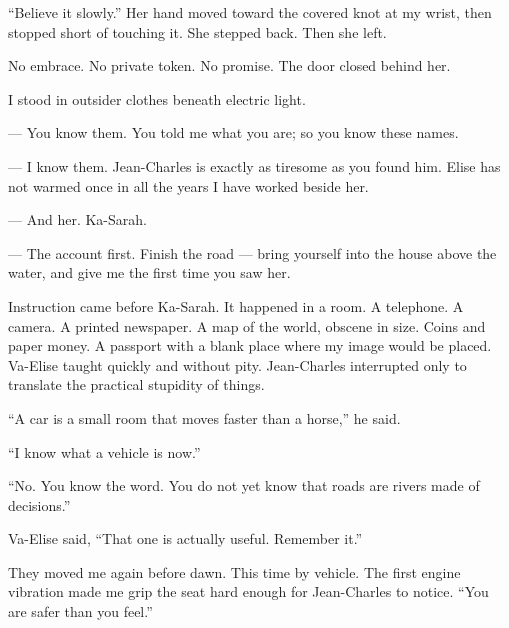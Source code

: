 ``Believe it slowly.'' Her hand moved toward the covered knot at my wrist, then stopped short of touching it. She stepped back. Then she left.\par

No embrace. No private token. No promise. The door closed behind her.\par

I stood in outsider clothes beneath electric light.\par

\ornament

\begin{room}

--- You know them. You told me what you are; so you know these names.

--- I know them. Jean-Charles is exactly as tiresome as you found him. Elise has not warmed once in all the years I have worked beside her.

--- And her. Ka-Sarah.

--- The account first. Finish the road --- bring yourself into the house above the water, and give me the first time you saw her.

\end{room}

\ornament

Instruction came before Ka-Sarah. It happened in a room. A telephone. A camera. A printed newspaper. A map of the world, obscene in size. Coins and paper money. A passport with a blank place where my image would be placed. Va-Elise taught quickly and without pity. Jean-Charles interrupted only to translate the practical stupidity of things.\par

``A car is a small room that moves faster than a horse,'' he said.\par

``I know what a vehicle is now.''\par

``No. You know the word. You do not yet know that roads are rivers made of decisions.''\par

Va-Elise said, ``That one is actually useful. Remember it.''\par

They moved me again before dawn. This time by vehicle. The first engine vibration made me grip the seat hard enough for Jean-Charles to notice. ``You are safer than you feel.''\par

